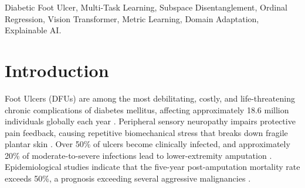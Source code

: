 \documentclass[journal]{IEEEtran}
\begin{document}
\begin{abstract}
The full 59,783,374-parameter architecture was evaluated across the DFUC2021 benchmark ($n = 5,955$ labeled samples) and a deduplicated Wagner cohort ($n = 11,371$ clean quarantined training samples). Across a rigorous 50-epoch multi-seed training campaign on the cryptographically verified leak-free split (Seeds 42, 123, 2026), DFU-WAGNER net achieves a mean Macro-F1 of \textbf{0.9456 $\pm$ 0.0043} and an overall accuracy of \textbf{93.65 $\pm$ 0.38\%} on the held-out development validation cohort ($n = 1,191$), reaching an \textit{Ischaemia} minority F1-score of \textbf{0.9338 $\pm$ 0.0090} (peak 0.9451) with \textbf{92.03 $\pm$ 1.02\%} sensitivity. Concurrently, the network achieves an ordinal Quadratic Weighted Kappa (QWK) of \textbf{0.7621 $\pm$ 0.0124} (peak 0.7750), adjacent depth accuracy of \textbf{91.09 $\pm$ 0.71\%}, and Mean Absolute Error (MAE) of \textbf{0.4433 $\pm$ 0.0109} grades on the clean Wagner validation set ($n = 303$). A $5 \times 4$ exploratory joint probability distribution models concurrent cross-taxonomy risk under conditional independence. Controlled ablations on the leak-free quarantined benchmark confirm that active hard-pair metric learning and uncertainty-gated domain alignment prevent negative transfer, while multi-task trade-offs and cross-dataset duplicate integrity are formally disclosed.
\end{abstract}

\begin{IEEEkeywords}
Diabetic Foot Ulcer, Multi-Task Learning, Subspace Disentanglement, Ordinal Regression, Vision Transformer, Metric Learning, Domain Adaptation, Explainable AI.
\end{IEEEkeywords}

\IEEEpeerreviewmaketitle

\section{Introduction}
 Foot Ulcers (DFUs) are among the most debilitating, costly, and life-threatening chronic complications of diabetes mellitus, affecting approximately 18.6 million individuals globally each year \cite{yap2022development, schaper2020practical}. Peripheral sensory neuropathy impairs protective pain feedback, causing repetitive biomechanical stress that breaks down fragile plantar skin \cite{schaper2020practical}. Over 50\% of ulcers become clinically infected, and approximately 20\% of moderate-to-severe infections lead to lower-extremity amputation \cite{schaper2020practical}. Epidemiological studies indicate that the five-year post-amputation mortality rate exceeds 50\%, a prognosis exceeding several aggressive malignancies \cite{yap2022development, armstrong1998validation}.
\end{document}
